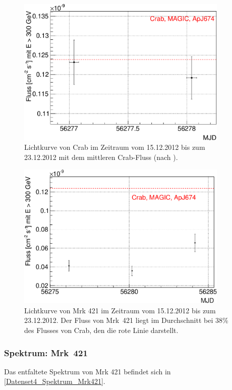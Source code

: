\begin{figure}
    \centering
    \includegraphics[width=0.9\textwidth]{./Plots/04_MrkAnalyse/Datenset4/Datenset4_LC_Crab.pdf}
    \caption{Lichtkurve von Crab im Zeitraum vom 15.12.2012 bis zum 23.12.2012 mit dem mittleren Crab-Fluss (nach \cite{LiteraturreferenzMAGIC}).}
    \label{Datenset4_LC_Crab}
\end{figure}

\begin{figure}
    \centering
    \includegraphics[width=0.9\textwidth]{./Plots/04_MrkAnalyse/Datenset4/Datenset4_LC_Mrk421.pdf}
    \caption{Lichtkurve von Mrk 421 im Zeitraum vom 15.12.2012 bis zum 23.12.2012.
    Der Fluss von Mrk~421 liegt im Durchschnitt bei 38\% des Flusses von Crab, den die rote Linie darstellt.}
    \label{Datenset4_LC_Mrk421}
\end{figure}


\subsubsection{Spektrum: Mrk~421}
Das entfaltete Spektrum von Mrk 421 befindet sich in \autoref{Datenset4_Spektrum_Mrk421}.


